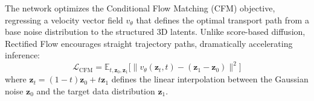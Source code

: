 The network optimizes the Conditional Flow Matching (CFM) \cite{rectifiedflow} objective, regressing a velocity vector field $v_\theta$ that defines the optimal transport path from a base noise distribution to the structured 3D latents. Unlike score-based diffusion, Rectified Flow encourages straight trajectory paths, dramatically accelerating inference:
\begin{equation}
\mathcal{L}_{\text{CFM}} = \mathbb{E}_{t, \mathbf{z}_0, \mathbf{z}_1} \Big[ \big\| v_\theta(\mathbf{z}_t, t) - (\mathbf{z}_1 - \mathbf{z}_0) \big\|^2 \Big]
\end{equation}
where $\mathbf{z}_t = (1-t)\mathbf{z}_0 + t\mathbf{z}_1$ defines the linear interpolation between the Gaussian noise $\mathbf{z}_0$ and the target data distribution $\mathbf{z}_1$.
